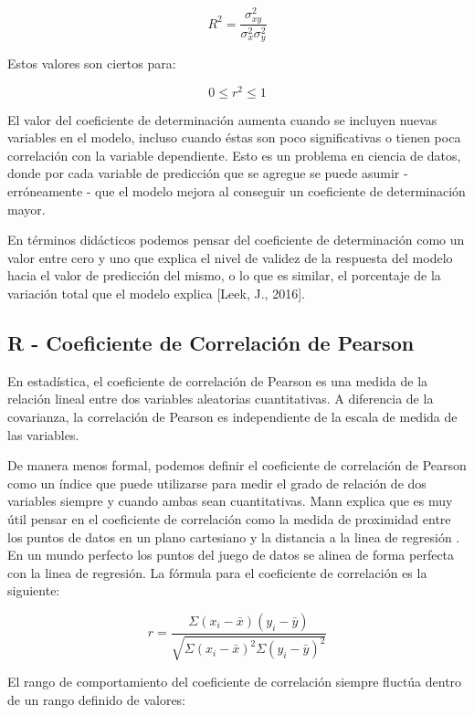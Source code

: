 \documentclass[letterpaper, spanish, 11pt]{report}
\begin{document}
\begin{equation}
 R^{2} = \frac{\sigma^2_{xy}}{\sigma^{2}_{x}\sigma^2_{y}}
\end{equation}

Estos valores son ciertos para:

\[ 0 \leq r^{2} \leq 1 \]

El valor del coeficiente de determinación aumenta cuando se incluyen nuevas variables en el modelo, incluso cuando éstas son poco significativas o tienen poca correlación con la variable dependiente. Esto es un problema en ciencia de datos, donde por cada variable de predicción que se agregue se puede asumir - erróneamente - que el modelo mejora al conseguir un coeficiente de determinación mayor. 

En términos didácticos podemos pensar del coeficiente de determinación como un valor entre cero y uno que explica el nivel de validez de la respuesta del modelo hacia el valor de predicción del mismo, o lo que es similar, el porcentaje de la variación total que el modelo explica [Leek, J., 2016]. 

\subsection{R - Coeficiente de Correlación de Pearson}
En estadística, el coeficiente de correlación de Pearson es una medida de la relación lineal entre dos variables aleatorias cuantitativas. A diferencia de la covarianza, la correlación de Pearson es independiente de la escala de medida de las variables.

De manera menos formal, podemos definir el coeficiente de correlación de Pearson como un índice que puede utilizarse para medir el grado de relación de dos variables siempre y cuando ambas sean cuantitativas. Mann explica que es muy útil pensar en el coeficiente de correlación como la medida de proximidad entre los puntos de datos en un plano cartesiano y la distancia a la linea de regresión \cite{intoStats7}. En un mundo perfecto los puntos del juego de datos se alinea de forma perfecta con la linea de regresión. La fórmula para el coeficiente de correlación es la siguiente:

\begin{equation}
r = \frac{\Sigma(x_i - \bar{x})(y_i - \bar{y})}{\sqrt{\Sigma(x_i - \bar{x})^2\Sigma(y_i - \bar{y})^2}}
\end{equation}

El rango de comportamiento del coeficiente de correlación siempre fluctúa dentro de un rango definido de valores:
\end{document}

